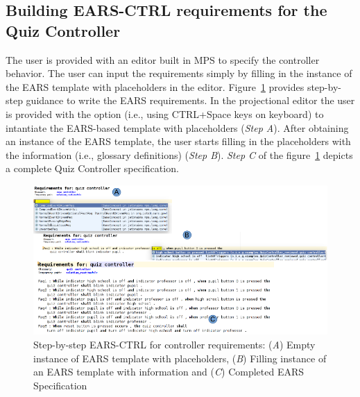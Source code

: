 \subsection{Building \textsf{EARS-CTRL} requirements for the Quiz Controller}
\vspace{-.2cm}
The user is provided with an editor built in MPS to specify the
controller behavior. The user can input the requirements simply by filling in the instance of the EARS template with
placeholders in the editor. Figure~\ref{fig:EARS_req} provides step-by-step
guidance to write the EARS requirements. In the projectional editor the user is
provided with the option (i.e., using CTRL+Space keys on keyboard) to intantiate
the EARS-based template with placeholders (\emph{Step A}). After obtaining an
instance of the EARS template, the user starts filling in the placeholders with the information
(i.e., glossary definitions) (\emph{Step B}). \emph{Step C} of the
figure~\ref{fig:EARS_req} depicts a complete Quiz Controller specification.
\begin{figure}[!h]
\centering
\includegraphics[width=1.2\textwidth]{./images/Req_Spec_Steps.png}
\caption{Step-by-step \textsf{EARS-CTRL} for controller requirements: (\emph{A})
Empty instance of EARS template with placeholders, (\emph{B}) Filling instance of an EARS
template with information and (\emph{C}) Completed EARS Specification }
\label{fig:EARS_req}
\end{figure}
\vspace{-.2cm}

